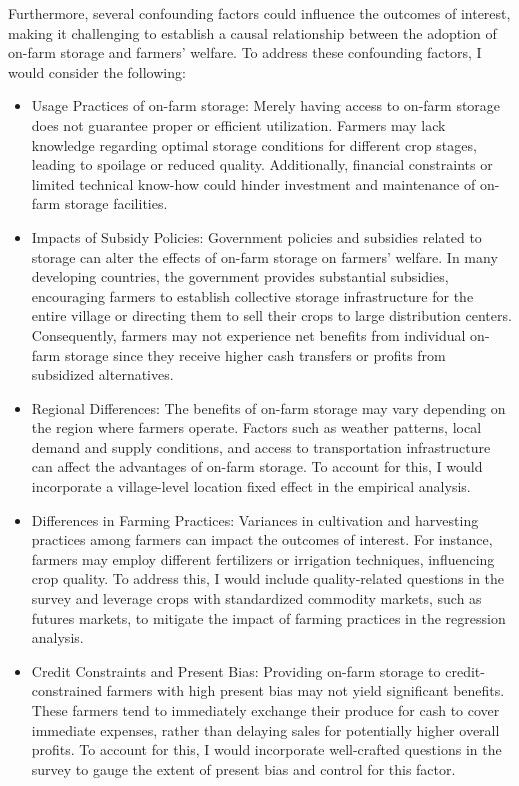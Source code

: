 Furthermore, several confounding factors could influence the outcomes of interest, making it challenging to establish a causal relationship between the adoption of on-farm storage and farmers' welfare. To address these confounding factors, I would consider the following:
\begin{itemize}
    \item Usage Practices of on-farm storage: Merely having access to on-farm storage does not guarantee proper or efficient utilization. Farmers may lack knowledge regarding optimal storage conditions for different crop stages, leading to spoilage or reduced quality. Additionally, financial constraints or limited technical know-how could hinder investment and maintenance of on-farm storage facilities.
    
    \item Impacts of Subsidy Policies: Government policies and subsidies related to storage can alter the effects of on-farm storage on farmers' welfare. In many developing countries, the government provides substantial subsidies, encouraging farmers to establish collective storage infrastructure for the entire village or directing them to sell their crops to large distribution centers. Consequently, farmers may not experience net benefits from individual on-farm storage since they receive higher cash transfers or profits from subsidized alternatives. 

    \item Regional Differences: The benefits of on-farm storage may vary depending on the region where farmers operate. Factors such as weather patterns, local demand and supply conditions, and access to transportation infrastructure can affect the advantages of on-farm storage. To account for this, I would incorporate a village-level location fixed effect in the empirical analysis.

    \item Differences in Farming Practices: Variances in cultivation and harvesting practices among farmers can impact the outcomes of interest. For instance, farmers may employ different fertilizers or irrigation techniques, influencing crop quality. To address this, I would include quality-related questions in the survey and leverage crops with standardized commodity markets, such as futures markets, to mitigate the impact of farming practices in the regression analysis.

    \item Credit Constraints and Present Bias: Providing on-farm storage to credit-constrained farmers with high present bias may not yield significant benefits. These farmers tend to immediately exchange their produce for cash to cover immediate expenses, rather than delaying sales for potentially higher overall profits. To account for this, I would incorporate well-crafted questions in the survey to gauge the extent of present bias and control for this factor.


\end{itemize}





